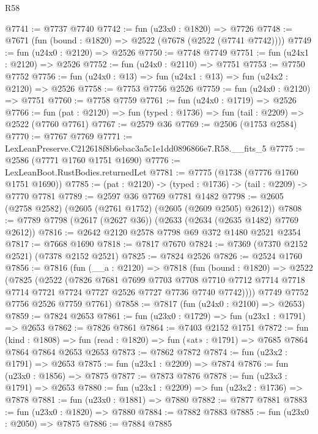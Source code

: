 \begin{lexlean}{R58}
\begin{coremodule}
@7741 := @7737 @7740
@7742 := fun (u23x0 : @1820) => @7726
@7748 := @7671 (fun (bound : @1820) => @2522 (@7678 (@2522 (@7741 @7742))))
@7749 := fun (u24x0 : @2120) => @2526
@7750 := @7748 @7749
@7751 := fun (u24x1 : @2120) => @2526
@7752 := fun (u24x0 : @2110) => @7751
@7753 := @7750 @7752
@7756 := fun (u24x0 : @13) => fun (u24x1 : @13) => fun (u24x2 : @2120) => @2526
@7758 := @7753 @7756 @2526
@7759 := fun (u24x0 : @2120) => @7751
@7760 := @7758 @7759
@7761 := fun (u24x0 : @1719) => @2526
@7766 := fun (pat : @2120) => fun (typed : @1736) => fun (tail : @2209) => @2522 (@7760 @7761)
@7767 := @2579 @36
@7769 := @2506 (@1753 @2584)
@7770 := @7767 @7769
@7771 := LexLeanPreserve.C212618f8b6ebac3a5c1e1dd0896866e7.R58.__fits_5
@7775 := @2586 (@7771 @1760 @1751 @1690)
@7776 := LexLeanBoot.RustBodies.returnedLet
@7781 := @7775 (@1738 (@7776 @1760 @1751 @1690))
@7785 := (pat : @2120) -> (typed : @1736) -> (tail : @2209) -> @7770 @7781
@7789 := @2597 @36 @7769 @7781 @1482
@7798 := @2605 (@2758 @2582) (@2605 (@2761 @1752) (@2605 (@2609 @2505) @2612))
@7808 := @7789 @7798 (@2617 (@2627 @36)) (@2633 (@2634 (@2635 @1482) @7769 @2612))
@7816 := @2642 @2120 @2578 @7798 @69 @372 @1480 @2521 @2354
@7817 := @7668 @1690
@7818 := @7817 @7670
@7824 := @7369 (@7370 @2152 @2521) (@7378 @2152 @2521)
@7825 := @7824 @2526
@7826 := @2524 @1760
@7856 := @7816
    (fun (__a : @2120) =>
    @7818
      (fun (bound : @1820) =>
      @2522
        (@7825
          (@2522
            (@7826
              @7681
              @7699
              @7703
              @7708
              @7710
              @7712
              @7714
              @7718
              @7714
              @7721
              @7724
              @7727
              @2526
              @7727
              @7736
              @7740
              @7742))))
      @7749
      @7752
      @7756
      @2526
      @7759
      @7761)
@7858 := @7817 (fun (u24x0 : @2100) => @2653)
@7859 := @7824 @2653
@7861 := fun (u23x0 : @1729) => fun (u23x1 : @1791) => @2653
@7862 := @7826 @7861
@7864 := @7403 @2152 @1751
@7872 := fun (kind : @1808) =>
  fun (read : @1820) => fun («at» : @1791) => @7685 @7864 @7864 @7864 @2653 @2653
@7873 := @7862 @7872
@7874 := fun (u23x2 : @1791) => @2653
@7875 := fun (u23x1 : @2209) => @7874
@7876 := fun (u23x0 : @1856) => @7875
@7877 := @7873 @7876
@7878 := fun (u23x3 : @1791) => @2653
@7880 := fun (u23x1 : @2209) => fun (u23x2 : @1736) => @7878
@7881 := fun (u23x0 : @1881) => @7880
@7882 := @7877 @7881
@7883 := fun (u23x0 : @1820) => @7880
@7884 := @7882 @7883
@7885 := fun (u23x0 : @2050) => @7875
@7886 := @7884 @7885

\end{coremodule}
\end{lexlean}
